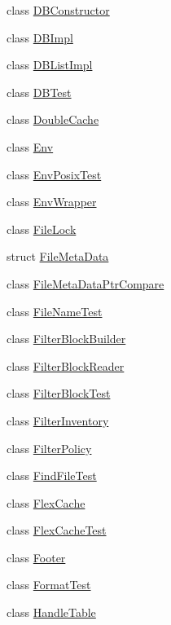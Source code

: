 \begin{DoxyCompactItemize}
\item 
class \hyperlink{classleveldb_1_1_d_b_constructor}{D\+B\+Constructor}
\item 
class \hyperlink{classleveldb_1_1_d_b_impl}{D\+B\+Impl}
\item 
class \hyperlink{classleveldb_1_1_d_b_list_impl}{D\+B\+List\+Impl}
\item 
class \hyperlink{classleveldb_1_1_d_b_test}{D\+B\+Test}
\item 
class \hyperlink{classleveldb_1_1_double_cache}{Double\+Cache}
\item 
class \hyperlink{classleveldb_1_1_env}{Env}
\item 
class \hyperlink{classleveldb_1_1_env_posix_test}{Env\+Posix\+Test}
\item 
class \hyperlink{classleveldb_1_1_env_wrapper}{Env\+Wrapper}
\item 
class \hyperlink{classleveldb_1_1_file_lock}{File\+Lock}
\item 
struct \hyperlink{structleveldb_1_1_file_meta_data}{File\+Meta\+Data}
\item 
class \hyperlink{classleveldb_1_1_file_meta_data_ptr_compare}{File\+Meta\+Data\+Ptr\+Compare}
\item 
class \hyperlink{classleveldb_1_1_file_name_test}{File\+Name\+Test}
\item 
class \hyperlink{classleveldb_1_1_filter_block_builder}{Filter\+Block\+Builder}
\item 
class \hyperlink{classleveldb_1_1_filter_block_reader}{Filter\+Block\+Reader}
\item 
class \hyperlink{classleveldb_1_1_filter_block_test}{Filter\+Block\+Test}
\item 
class \hyperlink{classleveldb_1_1_filter_inventory}{Filter\+Inventory}
\item 
class \hyperlink{classleveldb_1_1_filter_policy}{Filter\+Policy}
\item 
class \hyperlink{classleveldb_1_1_find_file_test}{Find\+File\+Test}
\item 
class \hyperlink{classleveldb_1_1_flex_cache}{Flex\+Cache}
\item 
class \hyperlink{classleveldb_1_1_flex_cache_test}{Flex\+Cache\+Test}
\item 
class \hyperlink{classleveldb_1_1_footer}{Footer}
\item 
class \hyperlink{classleveldb_1_1_format_test}{Format\+Test}
\item 
class \hyperlink{classleveldb_1_1_handle_table}{Handle\+Table}
\item 

\end{DoxyCompactItemize}
